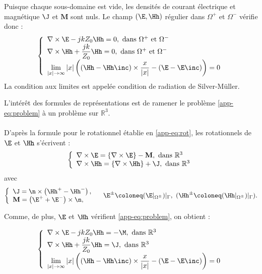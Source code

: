 Puisque chaque sous-domaine est vide, les densités de courant électrique et magnétique $\J$ et $\mathbf M$ sont nuls. Le champ $(\E, \Hh)$ régulier dans $\Omega^+$ et $\Omega^-$ vérifie donc : 
\begin{equation}
    \left\{\begin{array}{l}
        \nabla\times\E - jkZ_0\Hh = 0,\text{ dans } \Omega^+ \text{ et } \Omega^- \\
        \nabla\times\Hh + \dfrac{jk}{Z_0}\Hh = 0,\text{ dans } \Omega^+ \text{ et } \Omega^- \\
        \lim\limits_{|x|\to\infty} |x| \left(\left(\Hh - \Hh\inc\right)\times\dfrac{x}{|x|} - \left(\E - \E\inc\right)\right) = 0
    \end{array}\right.
    \label{app-eq:problem}
\end{equation}
%
La condition aux limites est appelée condition de radiation de Silver-Müller.

L'intérêt des formules de représentations est de ramener le problème \eqref{app-eq:problem} à un problème sur $\mathbb R^3$.

\paragraph{}
D'après la formule pour le rotationnel établie en \eqref{app-eq:rot}, les rotationnels de $\E$ et $\Hh$  s'écrivent :
\begin{equation}
    \left\{\begin{array}{l}
        \nabla\times\E = \{\nabla\times\E\} - \mathbf M, \text{ dans } \mathbb R^3 \\
        \nabla\times\Hh = \{\nabla\times\Hh\} + \J, \text{ dans } \mathbb R^3
    \end{array}\right.
\end{equation}
%
avec 
\begin{equation}
    \left\{\begin{array}{l}
        \J = \n\times\left(\Hh^+ - \Hh^-\right), \\
        \mathbf M =  \left(\E^+ + \E^-\right)\times\n,
    \end{array}\right.\quad \E^\pm \coloneq (\E|_{\Omega^\pm})|_\Gamma, \ (\Hh^\pm \coloneq (\Hh|_{\Omega^\pm})|_\Gamma).
\end{equation}

Comme, de plus, $\E$ et $\Hh$ vérifient \eqref{app-eq:problem}, on obtient : 

\begin{equation}
    \left\{\begin{array}{l}
        \nabla\times\E - jkZ_0\Hh = -\M, \text{ dans } \mathbb R^3\\
        \nabla\times\Hh + \dfrac{jk}{Z_0}\Hh = \J, \text{ dans } \mathbb R^3\\
        \lim\limits_{|x|\to\infty} |x| \left(\left(\Hh - \Hh\inc\right)\times\dfrac{x}{|x|} - \left(\E - \E\inc\right)\right) = 0
    \end{array}\right.
    \label{app-eq:problem-2}
\end{equation}

